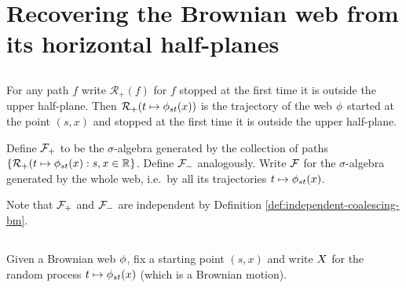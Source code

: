 \newcommand{\toinP}{\overset{\P}\to}
\newcommand{\statementoflemresampledetosampled}{$\resamplede \toinP \sampled$ as $\epsilon \to 0$}
{
\section{Recovering the Brownian web from its horizontal half-planes}

\label{recovering-from-half-planes}

\subsection{}


\newcommand{\restrictupper}{\mathcal{R}_{+}}

\begin{definition}
  For any path $f$ write $\restrictupper(f)$ for $f$ stopped at the
  first time it is outside the upper half-plane.  Then
  $\restrictupper(t \mapsto \web{s}{t}{x})$ is the trajectory of the
  web $\phi$ started at the point $(s,x)$ and stopped at the first
  time it is outside the upper half-plane.

  Define $\mathcal{F}_{+}$ to be the $\sigma$-algebra generated by the
  collection of paths $\{\restrictupper(t \mapsto \web{s}{t}{x} : s,x
  \in \R \}$.  Define $\mathcal{F}_{-}$ analogously.
  Write $\mathcal{F}$ for the $\sigma$-algebra generated by the
  whole web, i.e.\ by all its trajectories $t \mapsto \phi_{{s}{t}}(x)$.
\end{definition}

\begin{observation}
  Note that $\mathcal{F}_{+}$ and $\mathcal{F}_{-}$ are independent by Definition
  \ref{def:independent-coalescing-bm}.
\end{observation}

\subsection{}


\begin{notation}
Given a Brownian web $\phi$, fix a starting point $(s,x)$ and write
$X$ for the random process $t \mapsto \phi_{{s}{t}}(x)$
(which is a Brownian motion).
\end{notation}

}
